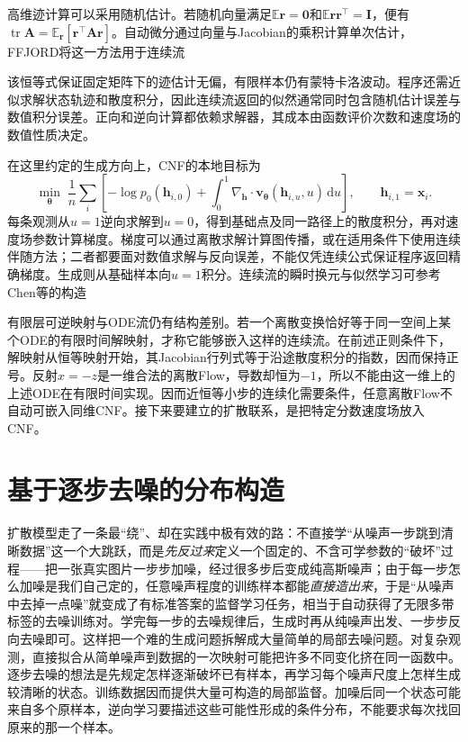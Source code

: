 高维迹计算可以采用随机估计。若随机向量满足$\mathbb{E}\bm{r}=\bm{0}$和$\mathbb{E}\bm{r}\bm{r}^{\top}=\bm{I}$，便有$\operatorname{tr}\bm{A}=\mathbb{E}_{\bm{r}}[\bm{r}^{\top}\bm{A}\bm{r}]$。自动微分通过向量与Jacobian的乘积计算单次估计，FFJORD将这一方法用于连续流

该恒等式保证固定矩阵下的迹估计无偏，有限样本仍有蒙特卡洛波动。程序还需近似求解状态轨迹和散度积分，因此连续流返回的似然通常同时包含随机估计误差与数值积分误差。正向和逆向计算都依赖求解器，其成本由函数评价次数和速度场的数值性质决定。

在这里约定的生成方向上，CNF的本地目标为
\begin{equation}
  \label{eq:pgm-generative-cnf-objective}
  \min_{\bm\theta}\;\frac1n\sum_i
   \left[-\log p_0(\bm h_{i,0})+
     \int_0^1\nabla_{\bm h}\!\cdot
          \bm v_{\bm\theta}(\bm h_{i,u},u)\,\mathrm du\right],
  \qquad \bm h_{i,1}=\bm x_i.
\end{equation}
每条观测从$u=1$逆向求解到$u=0$，得到基础点及同一路径上的散度积分，再对速度场参数计算梯度。梯度可以通过离散求解计算图传播，或在适用条件下使用连续伴随方法；二者都要面对数值求解与反向误差，不能仅凭连续公式保证程序返回精确梯度。生成则从基础样本向$u=1$积分。连续流的瞬时换元与似然学习可参考Chen等的构造

有限层可逆映射与ODE流仍有结构差别。若一个离散变换恰好等于同一空间上某个ODE的有限时间解映射，才称它能够嵌入这样的连续流。在前述正则条件下，解映射从恒等映射开始，其Jacobian行列式等于沿途散度积分的指数，因而保持正号。反射$x=-z$是一维合法的离散Flow，导数却恒为$-1$，所以不能由这一维上的上述ODE在有限时间实现。因而近恒等小步的连续化需要条件，任意离散Flow不自动可嵌入同维CNF。接下来要建立的扩散联系，是把特定分数速度场放入CNF。

\section{基于逐步去噪的分布构造}

\label{sec:pgm-generative-diffusion}

\label{sec:pgm-generative-diffusion-structure}

扩散模型走了一条最“绕”、却在实践中极有效的路：不直接学“从噪声一步跳到清晰数据”这一个大跳跃，而是\emph{先反过来}定义一个固定的、不含可学参数的“破坏”过程——把一张真实图片一步步加噪，经过很多步后变成纯高斯噪声；由于每一步怎么加噪是我们自己定的，任意噪声程度的训练样本都能\emph{直接造出来}，于是“从噪声中去掉一点噪”就变成了有标准答案的监督学习任务，相当于自动获得了无限多带标签的去噪训练对。学完每一步的去噪规律后，生成时再从纯噪声出发、一步步反向去噪即可。这样把一个难的生成问题拆解成大量简单的局部去噪问题。对复杂观测，直接拟合从简单噪声到数据的一次映射可能把许多不同变化挤在同一函数中。逐步去噪的想法是先规定怎样逐渐破坏已有样本，再学习每个噪声尺度上怎样生成较清晰的状态。训练数据因而提供大量可构造的局部监督。加噪后同一个状态可能来自多个原样本，逆向学习要描述这些可能性形成的条件分布，不能要求每次找回原来的那一个样本。

